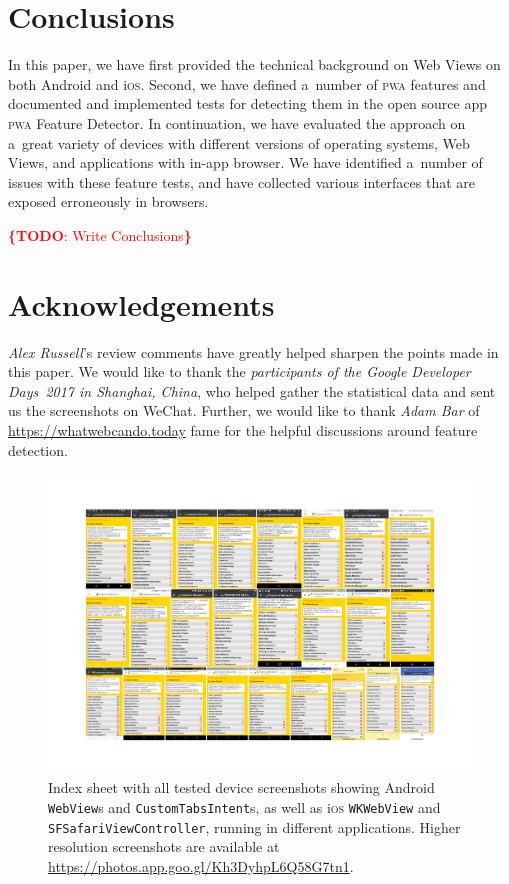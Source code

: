 \documentclass[sigconf]{acmart}
\newcommand{\todo}[1]{\noindent\textcolor{red}{{\bf \{TODO}: #1{\bf \}}}}
\begin{document}
\section{Conclusions}
\label{sec:conclusions}

In this paper, we have first provided the technical background on Web Views
on both Android and i\textsc{os}.
Second, we have defined a~number of \textsc{pwa} features
and documented and implemented tests for detecting them
in the open source app \textsc{pwa} Feature Detector. 
In continuation, we have evaluated the approach on a~great variety of devices
with different versions of operating systems, Web Views,
and applications with in-app browser.
We have identified a~number of issues with these feature tests,
and have collected various interfaces that are exposed erroneously in browsers.

\todo{Write Conclusions}

\section*{Acknowledgements}

\emph{Alex Russell}'s review comments have greatly helped sharpen the points made in this paper.
We would like to thank the \emph{participants of the Google Developer Days~2017 in Shanghai, China},
who helped gather the statistical data and sent us
the screenshots on WeChat.
Further, we would like to thank \emph{Adam Bar} of \url{https://whatwebcando.today} fame
for the helpful discussions around feature detection.

\begin{figure}[b]
  \begin{center}
  \centerline{\includegraphics[width=\paperwidth, trim=0cm 2.5cm 0cm 0cm, clip]{index-sheet.pdf}}
  \caption{Index sheet with all tested device screenshots showing Android \texttt{WebView}s and
    \texttt{CustomTabsIntent}s, as well as i\textsc{os} \texttt{WKWebView} and \texttt{SFSafariViewController},
    running in different applications.
    Higher resolution screenshots are available at \url{https://photos.app.goo.gl/Kh3DyhpL6Q58G7tn1}.}
  \label{fig:indexsheet}
  \end{center}
\end{figure}



\end{document}

